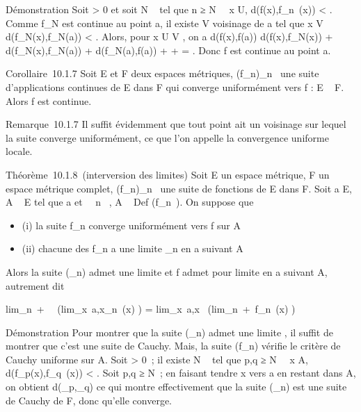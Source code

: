 \documentclass[]{article}
\begin{document}
Démonstration Soit \epsilon \textgreater{} 0 et soit N \in {}~ tel que n ≥ N
\rigtharrow~\forall~x \in U, d(f(x),f_n~(x)) \textless{}
\epsilon {} . Comme f_N est continue au point a,
il existe V voisinage de a tel que x \in V \rigtharrow~
d(f_N(x),f_N(a)) \textless{} \epsilon {} . Alors, pour x \in U \bigcap V , on a d(f(x),f(a)) \leq
d(f(x),f_N(x)) + d(f_N(x),f_N(a)) +
d(f_N(a),f(a)) \leq \epsilon {} + \epsilon
{} + \epsilon {} = \epsilon. Donc f est
continue au point a.

Corollaire~10.1.7 Soit E et F deux espaces métriques,
(f_n)_n\in{}~ une suite d'applications continues de E dans
F qui converge uniformément vers f : E \rightarrow~ F. Alors f est continue.

Remarque~10.1.7 Il suffit évidemment que tout point ait un voisinage sur
lequel la suite converge uniformément, ce que l'on appelle la
convergence uniforme locale.

Théorème~10.1.8~(interversion des limites) Soit E un espace métrique, F
un espace métrique complet, (f_n)_n\in{}~ une suite de
fonctions de E dans F. Soit a \in E, A \subset~ E tel que a
\in\overlineA et \forall~~n \in {}~, A
\subset~ Def (f_n~). On suppose que

\begin{itemize}
\itemsep1pt\parskip0pt
\item
  (i) la suite f_n converge uniformément vers f sur A
\item
  (ii) chacune des f_n a une limite \ell_n en a suivant A
\end{itemize}

Alors la suite (\ell_n) admet une limite \ell et f admet \ell pour
limite en a suivant A, autrement dit

lim_n\rightarrow~+\infty~~\left
(lim_x\rightarrow~a,x\inAf_n~(x)\right
) = lim_x\rightarrow~a,x\inA~\left
(lim_n\rightarrow~+\infty~f_n~(x)\right
)

Démonstration Pour montrer que la suite (\ell_n) admet une limite
\ell, il suffit de montrer que c'est une suite de Cauchy. Mais, la suite
(f_n) vérifie le critère de Cauchy uniforme sur A. Soit \epsilon
\textgreater{} 0~; il existe N \in {}~ tel que p,q ≥ N
\rigtharrow~\forall~x \in A, d(f_p(x),f_q~(x))
\textless{} \epsilon. Soit p,q ≥ N~; en faisant tendre x vers a en restant dans
A, on obtient d(\ell_p,\ell_q) \leq \epsilon ce qui montre
effectivement que la suite (\ell_n) est une suite de Cauchy de F,
donc qu'elle converge.
\end{document}
